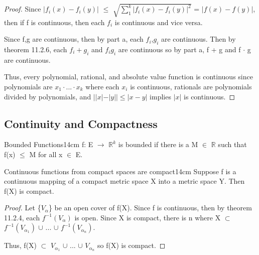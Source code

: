     \begin{proof}
        Since $|f_i(x) - f_i(y)|$
        $\leq$ $\sqrt{\sum_1^k |f_i(x) - f_i(y)|^2}$
        = $|f(x) - f(y)|$, then if f is continuous, then
        each $f_i$ is continuous and vice versa.

        \vspace{0.2cm}

        Since f,g are continuous, then by part a, each $f_i$,$g_i$ are continuous.
        Then by {\color{red} theorem 11.2.6},
        each $f_i + g_i$ and $f_i g_i$ are continuous so
        by part a, f + g and f $\cdot$ g are continuous.

        \vspace{0.2cm}

        Thus, every polynomial, rational, and absolute value function is continuous
        since polynomials are $x_1 \cdot ... \cdot x_k$ where each $x_i$
        is continuous, rationals are polynomials divided by polynomials,
        and $||x| - |y|| \leq |x - y|$ implies $|x|$ is continuous.
    \end{proof}

    \newpage





\subsection{ Continuity and Compactness }

    \begin{definition}{Bounded Functions}{14cm}
        f: E $\rightarrow$ $\mathbb{R}^k$ is bounded if there is a
        M $\in$ $\mathbb{R}$ such that f(x) $\leq$ M for all x $\in$ E.        
    \end{definition}

    \vspace{0.5cm}



    \begin{wtheorem}{Continuous functions from compact spaces are compact}{14cm}
        Suppose f is a continuous mapping of a compact metric space X
        into a metric space Y. Then f(X) is compact.        
    \end{wtheorem}

    \begin{proof}
        Let \{$V_{\alpha}$\} be an open cover of f(X).
        Since f is continuous, then by {\color{red} theorem 11.2.4},
        each $f^{-1}(V_{\alpha})$ is open.
        Since X is compact, there is n where
        X $\subset$ $f^{-1}(V_{\alpha_1})$ $\cup$ ... $\cup$ $f^{-1}(V_{\alpha_n})$.

        Thus, f(X) $\subset$ $V_{\alpha_1}$ $\cup$ ... $\cup$ $V_{\alpha_n}$
        so f(X) is compact.
    \end{proof}



